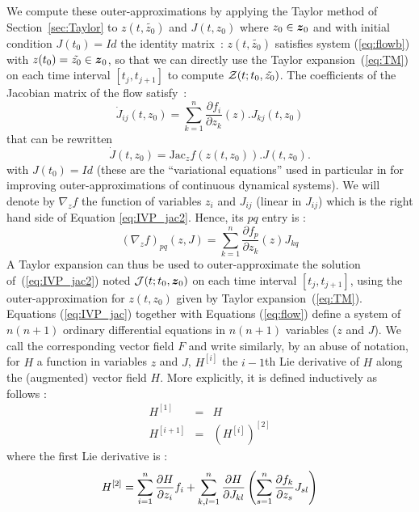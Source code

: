 \documentclass{sig-alternate-05-2015}
\begin{document}
We compute these outer-approximations by applying the Taylor method of Section~\ref{sec:Taylor} to  $z(t,\tilde{z_0})$ 
and $J(t,z_0)$ where $z_0 \in \z_0$ and with initial condition $J(t_0)=Id$ the identity matrix~: $z(t,\tilde{z_0})$ satisfies system  (\ref{eq:flowb}) with $z(t_0)=\tilde{z_0}\in \z_0$, so that we can directly 
use the Taylor expansion~(\ref{eq:TM}) on each time interval $[t_j,t_{j+1}]$ to compute ${\cal Z}(t;t_0,\tilde{z_0})$. 
The coefficients of the Jacobian matrix of the flow satisfy~:
\begin{equation}
\dot{J}_{ij}(t,z_0) %
= \sum\limits_{k=1}^n \frac{\partial f_i}{\partial z_k}(z) . J_{kj}(t,z_0)
\label{eq:IVP_jac}
\end{equation} 
 that can be rewritten
\begin{equation}
\dot{J}(t,z_0) =  \mbox{Jac}_z f(z(t,z_0)) . J(t,z_0).
\label{eq:IVP_jac2}
\end{equation} 
with $J(t_0)=Id$ (these are the ``variational equations'' used in particular in \cite{Zgliczynski2002}
for improving outer-approximations of continuous dynamical systems).
We will %
denote by $\nabla_z f$ the function of variables $z_i$ and $J_{ij}$ (linear in $J_{ij}$) which is
the right hand side of Equation \ref{eq:IVP_jac2}. Hence, its $pq$ entry is : 
\begin{equation}
(\nabla_z f)_{pq}(z,J) = \sum\limits_{k=1}^n \frac{\partial f_p}{\partial z_k}(z) J_{kq}
\label{pqentry}
\end{equation}
A Taylor expansion can thus be used to outer-approximate the solution of~(\ref{eq:IVP_jac2}) noted ${\cal J}(t;t_0,\z_0)$ on each time interval  $[t_j,t_{j+1}]$, 
using the outer-approximation for $z(t,z_0)$ given by Taylor expansion~(\ref{eq:TM}).
Equations (\ref{eq:IVP_jac}) together with Equations
(\ref{eq:flow}) define a system of $n(n+1)$ ordinary differential equations in $n(n+1)$
variables ($z$ and $J$). We call the corresponding vector field $F$ and
write similarly, by an abuse of notation, for $H$ a function in variables $z$ and $J$,
$H^{[i]}$ the $i-1$th Lie derivative of $H$ along the (augmented) vector field $H$. More
explicitly, it is defined inductively as follows : 
\begin{eqnarray}
H^{[1]} & = & H \\ 
H^{[i+1]} & = & (H^{[i]})^{[2]}
\end{eqnarray}
\noindent where the first Lie derivative is :
\begin{equation}
H^{[2]} = 
\sum\limits_{i=1}^n \frac{\partial H}{\partial z_i} f_i \\
+\sum\limits_{k,l=1}^n \frac{\partial H}{\partial J_{kl}} \left(
\sum\limits_{s=1}^n \frac{\partial f_k}{\partial z_s} J_{sl}\right)
\label{eqfirstH}
\end{equation}
\end{document}
